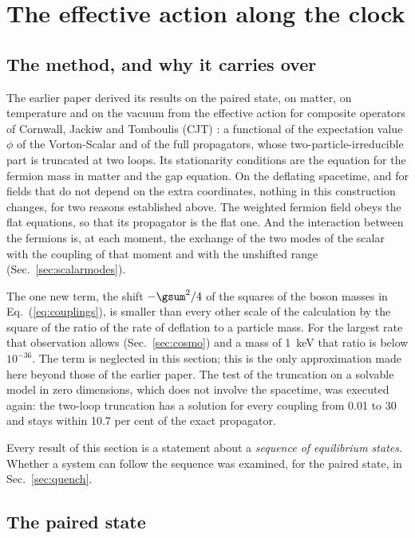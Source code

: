 \section{The effective action along the clock}
\label{sec:cjt}

\subsection{The method, and why it carries over}

The earlier paper derived its results on the paired state, on matter, on temperature and on the
vacuum from the effective action for composite operators of Cornwall, Jackiw and Tomboulis (CJT)
\cite{CJT1974}: a functional of the expectation value $\phi$ of the Vorton-Scalar and of the full
propagators, whose two-particle-irreducible part is truncated at two loops. Its stationarity
conditions are the equation for the fermion mass in matter and the gap equation. On the deflating
spacetime, and for fields that do not depend on the extra coordinates, nothing in this construction
changes, for two reasons established above. The weighted fermion field obeys the flat equations, so
that its propagator is the flat one. And the interaction between the fermions is, at each moment,
the exchange of the two modes of the scalar with the coupling of that moment and with the unshifted
range (Sec.~\ref{sec:scalarmodes}).

The one new term, the shift $-\gsum^{2}/4$ of the squares of the boson masses in
Eq.~(\ref{eq:couplings}), is smaller than every other scale of the calculation by the square of the
ratio of the rate of deflation to a particle mass. For the largest rate that observation allows
(Sec.~\ref{sec:cosmo}) and a mass of 1~keV that ratio is below $10^{-36}$. The term is neglected in
this section; this is the only approximation made here beyond those of the earlier paper. The test
of the truncation on a solvable model in zero dimensions, which does not involve the spacetime, was
executed again: the two-loop truncation has a solution for every coupling from 0.01 to 30 and stays
within 10.7 per cent of the exact propagator.

Every result of this section is a statement about a \emph{sequence of equilibrium states}. Whether a
system can follow the sequence was examined, for the paired state, in Sec.~\ref{sec:quench}.

\subsection{The paired state}

